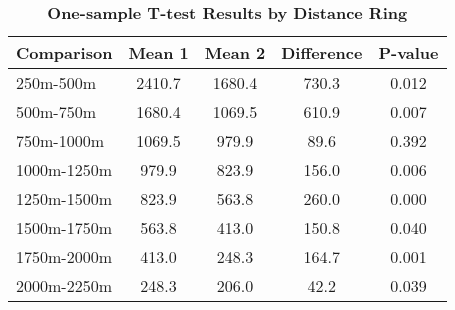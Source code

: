 \begin{table}[htbp]
\centering
\begin{tabular}{l|c c c c}
\hline
Comparison & Mean 1 & Mean 2 & Difference & P-value \\
\hline
250m-500m & 2410.7 & 1680.4 & 730.3 & 0.012 \\
500m-750m & 1680.4 & 1069.5 & 610.9 & 0.007 \\
750m-1000m & 1069.5 & 979.9 & 89.6 & 0.392 \\
1000m-1250m & 979.9 & 823.9 & 156.0 & 0.006 \\
1250m-1500m & 823.9 & 563.8 & 260.0 & 0.000 \\
1500m-1750m & 563.8 & 413.0 & 150.8 & 0.040 \\
1750m-2000m & 413.0 & 248.3 & 164.7 & 0.001 \\
2000m-2250m & 248.3 & 206.0 & 42.2 & 0.039 \\
\hline
\end{tabular}
\caption{\textbf{One-sample T-test Results by Distance Ring}}
\label{tab:ttests}
\end{table}

